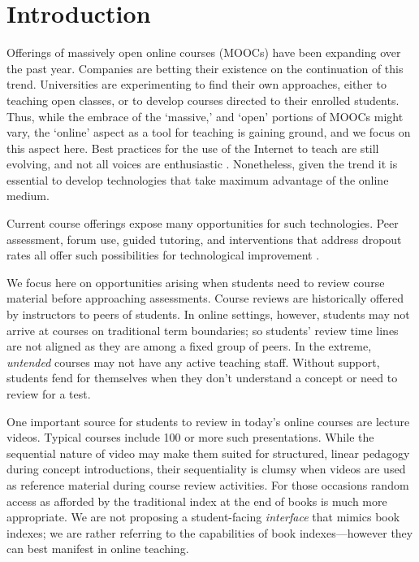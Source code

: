 \section{Introduction}
\label{sec:intro}

Offerings of massively open online courses (MOOCs) have been expanding
over the past year. Companies are betting their existence on the
continuation of this trend. Universities are experimenting to find
their own approaches, either to teaching open classes, or to develop
courses directed to their enrolled students. Thus, while the embrace
of the `massive,' and `open' portions of MOOCs might vary, the
`online' aspect as a tool for teaching is gaining ground, and we focus
on this aspect here. Best practices for the use of the Internet to
teach are still evolving, and not all voices are enthusiastic
\cite{Eckerdal2014}. Nonetheless, given the trend it is essential to
develop technologies that take maximum advantage of the online medium.

Current course offerings expose many opportunities for such
technologies. Peer assessment, forum use, guided tutoring, and
interventions that address dropout rates all offer such possibilities
for technological improvement \cite{Piech2013,
  balfour2013,Coetzee2014, agrawal2015, halawa2014dropout,
  yang2013turn}.

We focus here on opportunities arising when students need to review
course material before approaching assessments. Course reviews are
historically offered by instructors to peers of students. In online
settings, however, students may not arrive at courses on traditional
term boundaries; so students' review time lines are not aligned as
they are among a fixed group of peers. In the extreme,
\textit{untended} courses may not have any active teaching
staff. Without support, students fend for themselves when they don't
understand a concept or need to review for a test.

One important source for students to review in today's online courses
are lecture videos. Typical courses include 100 or more such
presentations. While the sequential nature of video may make them
suited for structured, linear pedagogy during concept introductions,
their sequentiality is clumsy when videos are used as reference
material during course review activities. For those occasions random
access as afforded by the traditional index at the end of books is
much more appropriate. We are not proposing a student-facing {\em
  interface} that mimics book indexes; we are rather referring to the
capabilities of book indexes---however they can best manifest in
online teaching.

